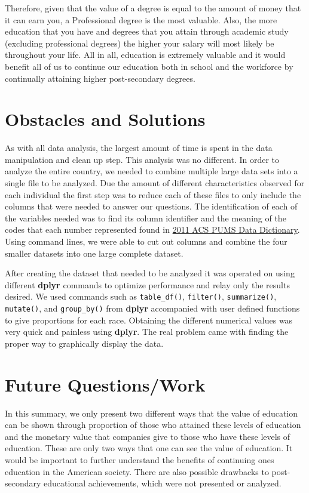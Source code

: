 \documentclass{article}
\begin{document}
Therefore, given that the value of a degree is equal to the amount of money that it can earn you,
a Professional degree is the most valuable. Also, the more education that you have and degrees that you attain through 
academic study (excluding professional degrees) the higher your salary will most likely be throughout your life.  All in all, education
is extremely valuable and it would benefit all of us to continue our education both in school and the workforce by continually
attaining higher post-secondary degrees. 


\section{Obstacles and Solutions}

As with all data analysis, the largest amount of time is spent in the data manipulation and clean up step. This 
analysis was no different. In order to analyze the entire country, we needed to combine multiple large data sets into a
single file to be analyzed. Due the amount of different characteristics observed for each individual the first step was to 
reduce each of these files to only include the columns that were needed to answer our questions. The identification of 
each of the variables needed was to find its column identifier and the meaning of the codes that each number represented
found in \underline{2011 ACS PUMS Data Dictionary}. Using command lines, we were able to cut out columns and combine 
the four smaller datasets into one large complete dataset. 

After creating the dataset that needed to be analyzed it was operated on using different \textbf{dplyr} commands to 
optimize performance and relay only the results desired. We used commands such as \texttt{table\_df()}, \texttt{filter()},
 \texttt{summarize()}, \texttt{mutate()}, and \texttt{group\_by()} from \textbf{dplyr} accompanied with user defined
  functions to give proportions for each race. Obtaining the different numerical values was very quick and painless using
  \textbf{dplyr}. The real problem came with finding the proper way to graphically display the data.

\section{Future Questions/Work}

In this summary, we only present two different ways that the value of education can be shown through proportion
of those who attained these levels of education and the monetary value that companies give to those who have these
levels of education. These are only two ways that one can see the value of education. It would be important to further
understand the benefits of continuing ones education in the American society. There are also possible drawbacks to 
post-secondary educational achievements, which were not presented or analyzed. 
\end{document}

